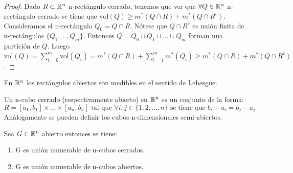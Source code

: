 \begin{proof}
    Dado $R \subset \mathbb{R}^n$ n-rectángulo cerrado, tenemos que ver que $\forall Q \in \mathbb{R}^n$ n-rectángulo cerrado se tiene que $\text{vol}(Q) \geq m^*(Q \cap R) + m^*(Q \cap R^c)$. Consideramos el n-rectángulo $Q_0 = Q \cap R$. Nótese que $Q \cap R^c$ es unión finita de n-rectángulos $\{Q_1,\ldots, Q_m\}$. Entonces $Q = Q_0 \cup Q_1 \cup \ldots \cup Q_m$ forman una partición de $Q$. Luego $\text{vol}(Q) = \sum_{i=0}^m \text{vol}(Q_i) = m^*(Q \cap R) + \sum_{i=1}^m m^*(Q_i) \geq m^*(Q \cap R) + m^*(Q \cap R^c)$.
\end{proof}

\begin{observación}
En $\mathbb{R}^n$ los rectángulos abiertos son medibles en el sentido de Lebesgue.
\end{observación}

\begin{definición}
Un n-cubo cerrado (respectivamente abierto) en $\mathbb{R}^n$ es un conjunto de la forma:
\begin{equation}
    R = [a_1, b_1] \times \ldots \times [a_n, b_n] \text{ tal que } \forall i,j \in \{1,2,...,n\} \text{ se tiene que } b_i - a_i = b_j - a_j
\end{equation}
Análogamente se pueden definir los cubos n-dimensionales semi-abiertos.
\end{definición}


\begin{teorema}
    Sea $G \in \mathbb{R}^n$ abierto entonces se tiene:
    \vspace{-0.5em}
    \begin{enumerate}
        \item G es unión numerable de n-cubos cerrados.
        \item G es unión numerable de n-cubos abiertos.
    \end{enumerate}
\end{teorema}

